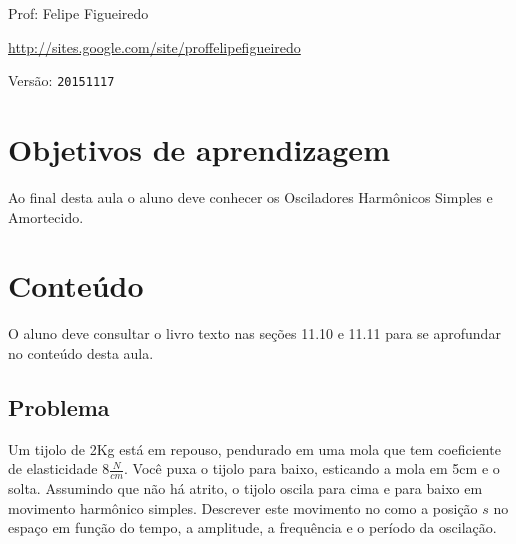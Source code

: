 \documentclass[a4paper]{article}
\begin{document}
\parbox[c]{.825\textwidth}{\raggedright%
{Prof: Felipe Figueiredo\par}
{\url{http://sites.google.com/site/proffelipefigueiredo}\par}
}

Versão: \verb|20151117|



\section{Objetivos de aprendizagem}

Ao final desta aula o aluno deve conhecer os Osciladores Harmônicos
Simples e Amortecido.



\section{Conteúdo}

O aluno deve consultar o livro texto nas seções 11.10 e 11.11 para se
aprofundar no conteúdo desta aula.

\subsection{Problema}

Um tijolo de 2Kg está em repouso, pendurado em uma mola que tem
coeficiente de elasticidade 8$\frac{N}{cm}$. Você puxa o tijolo para
baixo, esticando a mola em 5cm e o solta. Assumindo que não há atrito,
o tijolo oscila para cima e para baixo em movimento harmônico
simples. Descrever este movimento no como a posição $s$ no espaço em
função do tempo, a amplitude, a frequência e o período da oscilação.
\end{document}
